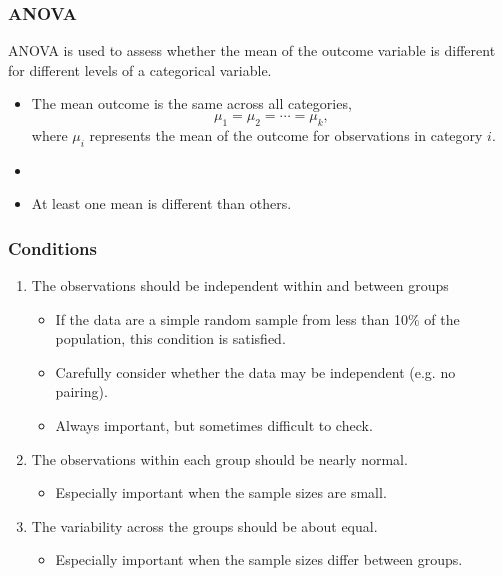 \documentclass[slidestop,compress,mathserif]{beamer}
\begin{document}

\begin{frame}
\frametitle{ANOVA}

ANOVA is used to assess whether the mean of the outcome variable is different for different levels of a categorical variable.


\begin{itemize}
\item[]  The mean outcome is the same across all categories, 
\[\mu_1 = \mu_2 = \cdots = \mu_k, \]
where $\mu_i$ represents the mean of the outcome for observations in category $i$.
\item[]
\item[]  At least one mean is different than others.
\end{itemize}

\end{frame}


\begin{frame}
\frametitle{Conditions}

\begin{enumerate}

\item The observations should be independent within and between groups

\begin{itemize}
\item If the data are a simple random sample from less than 10\% of the population, this condition is satisfied.
\item Carefully consider whether the data may be independent (e.g. no pairing). 
\item Always important, but sometimes difficult to check.
\end{itemize}


\item The observations within each group should be nearly normal.

\begin{itemize}
\item Especially important when the sample sizes are small.
\end{itemize}



\item The variability across the groups should be about equal.

\begin{itemize}
\item Especially important when the sample sizes differ between groups.
\end{itemize}


\end{enumerate}

\end{frame}
\end{document}
